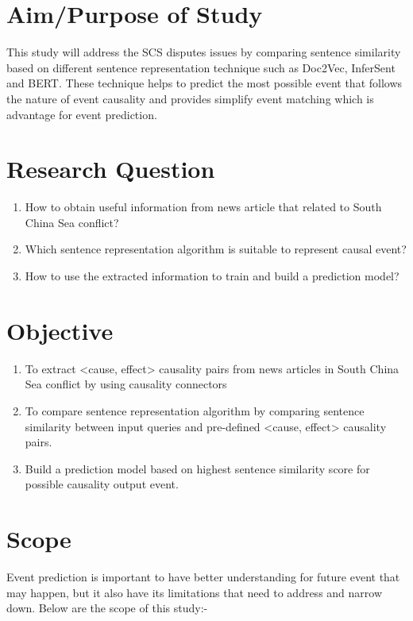 \documentclass[twoside]{utmthesis}
\begin{document}
\section{Aim/Purpose of Study}
This study will address the SCS disputes issues by comparing sentence similarity based on different sentence representation technique such as Doc2Vec, InferSent and BERT. These technique helps to predict the most possible event that follows the nature of event causality and provides simplify event matching which is advantage for event prediction.  

\section{Research Question} 
\begin{enumerate}
	\item How to obtain useful information from news article that related to South China Sea conflict?
	\item Which sentence representation algorithm is suitable to represent causal event?
	\item How to use the extracted information to train and build a prediction model?
\end{enumerate}

\section{Objective}
\begin{enumerate}
	
	\item To extract <cause, effect> causality pairs from news articles in South China Sea conflict by using causality connectors
	
	\item To compare sentence representation algorithm by comparing sentence similarity between input queries and pre-defined <cause, effect> causality pairs. 
	
	\item Build a prediction model based on highest sentence similarity score for possible causality output event.  
\end{enumerate}

\section{Scope} 
Event prediction is important to have better understanding for future event that may happen, but it also have its limitations that need to address and narrow down. Below are the scope of this study:-
\end{document}
